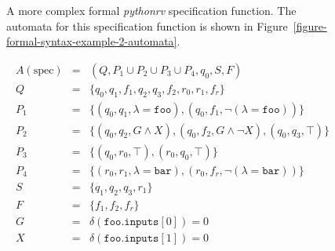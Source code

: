 
\begin{figure}[h!]
	\begin{center}
	\begin{minipage}{0.9\textwidth}
	
	\end{minipage}
	\end{center}

  \caption{A more complex formal \textit{pythonrv} specification function. The automata for
    this specification function is shown in
    Figure~\ref{figure-formal-syntax-example-2-automata}.}
	\label{figure-formal-syntax-example-2}
\end{figure}

\begin{figure}[h!]
	\begin{minipage}{0.9\textwidth}
		\centering
    \[
      \begin{array}{rcl}
        A(\text{spec}) & = & (Q, P_1 \cup P_2 \cup P_3 \cup P_4, q_0, S, F) \\
                     Q & = & \{q_0, q_1, f_1, q_2, q_3, f_2, r_0, r_1, f_r\} \\
                   P_1 & = & \{(q_0, q_1, \lambda = \texttt{foo}), (q_0, f_1, \neg(\lambda = \texttt{foo}))\} \\
                   P_2 & = & \{(q_0, q_2, G \wedge X), (q_0, f_2, G \wedge \neg X), (q_0, q_3, \top)\} \\
                   P_3 & = & \{(q_0, r_0, \top), (r_0, q_0, \top)\} \\
                   P_4 & = & \{(r_0, r_1, \lambda = \texttt{bar}), (r_0, f_r, \neg(\lambda = \texttt{bar}))\} \\
                     S & = & \{q_1, q_2, q_3, r_1\} \\
                     F & = & \{f_1, f_2, f_r\} \\
                     G & = & \delta(\texttt{foo.inputs$[0]$}) = 0 \\
                     X & = & \delta(\texttt{foo.inputs$[1]$}) = 0
      \end{array}
    \]
	\end{minipage}

  \bigskip

	\begin{minipage}{0.9\textwidth}
		\centering
		\begin{tikzpicture}[->,shorten >=1pt,node distance=3.5cm,on
      grid,auto,scale=.5,semithick,>=stealth]


\end{tikzpicture}
\end{minipage}
\end{figure}
